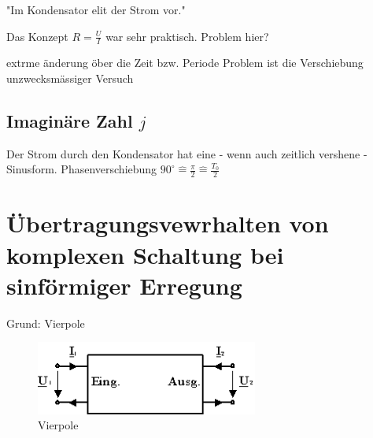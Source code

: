 \documentclass{article}
\begin{document}
\begin{figure}[h!]
  \begin{center}
  \end{center}
\end{figure}

"Im Kondensator elit der Strom vor."



Das Konzept $ R = \frac{U}{I}$ war sehr praktisch. Problem hier?


extrme änderung öber die Zeit bzw. Periode
Problem ist die Verschiebung unzwecksmässiger Versuch


\subsection{Imaginäre Zahl $j$}


Der Strom durch den Kondensator hat eine - wenn auch zeitlich vershene - Sinusform. Phasenverschiebung $ 90^{\circ} \hat{=} \frac{\pi}{2} \hat{=} \frac{T_0}{2}$


\newpage

\section{Übertragungsvewrhalten von komplexen Schaltung bei sinförmiger Erregung} %


Grund: Vierpole

\begin{figure}[h]
    \centering
    \includegraphics[width=0.65\textwidth,left]{dito01}
    \caption{Vierpole}
    \label{fig:1}
\end{figure}
\setlength{\parindent}{0cm} 
\end{document}
